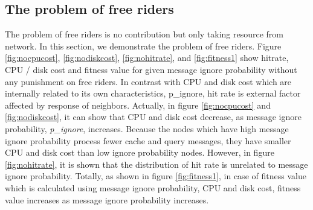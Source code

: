 \documentclass[12pt,journal,draftcls,letterpaper,onecolumn]{IEEEtran}
\begin{document}
\subsection{The problem of free riders}\label{sec:problem}
The problem of free riders is no contribution but only taking resource from network. 
In this section, we demonstrate the problem of free riders. Figure \ref{fig:nocpucost}, \ref{fig:nodiskcost}, 
\ref{fig:nohitrate}, and \ref{fig:fitness1} show hitrate, CPU / disk cost and fitness value
for given message ignore probability without any punishment on free riders. In contrast with
CPU and disk cost which are internally related to its own characteristics, p\_ignore, hit rate is
external factor affected by response of neighbors. Actually, in figure \ref{fig:nocpucost} and \ref{fig:nodiskcost}, 
it can show that CPU and disk cost decrease, as message ignore probability, \emph{p\_ignore}, increases. Because
the nodes which have high message ignore probability process fewer cache and query
messages, they have smaller CPU and disk cost than low ignore probability nodes. However, in
figure \ref{fig:nohitrate}, it is shown that the distribution of hit rate is unrelated to message ignore
probability. Totally, as shown in figure \ref{fig:fitness1}, in case of fitness value which is calculated using
message ignore probability, CPU and disk cost, fitness value increases as message ignore
probability increases.
\end{document}
